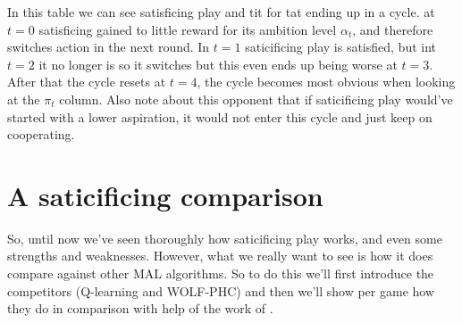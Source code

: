 In this table we can see satisficing play and tit for tat ending up in a cycle.
at $t=0$ satisficing gained to little reward for its ambition level $\alpha_t$,
and therefore switches action in the next round. In $t=1$ saticificing play
is satisfied, but int $t=2$ it no longer is so it switches but this even ends
up being worse at $t=3$. After that the cycle resets at $t=4$, the cycle becomes
most obvious when looking at the $\pi_t$ column. Also note about this opponent
that if saticificing play would've started with a lower aspiration, it would
not enter this cycle and just keep on cooperating.

\noindent
{}

\section{A saticificing comparison}
\drafting So, until now we've seen thoroughly how saticificing play works, and even some
strengths and weaknesses. However, what we really want to see is how it does
compare against other MAL algorithms. So to do this we'll first introduce the
competitors (Q-learning and WOLF-PHC) and then we'll show per game how they
do in comparison with help of the work of \citep{crandall}.

